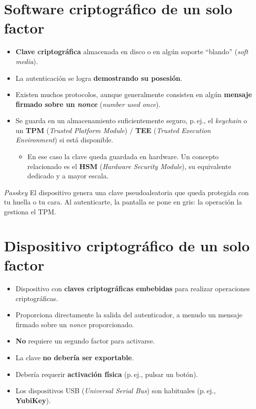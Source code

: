 \documentclass[11pt,a4paper]{report}
\begin{document}
\section{Software criptográfico de un solo factor}
 
\begin{itemize}
  \item \textbf{Clave criptográfica} almacenada en disco o en algún soporte ``blando'' (\emph{soft media}).
  \item La autenticación se logra \textbf{demostrando su posesión}.
  \item Existen muchos protocolos, aunque generalmente consisten en algún \textbf{mensaje firmado sobre un \emph{nonce}} (\emph{number used once}).
  \item Se guarda en un almacenamiento suficientemente seguro, p.\,ej., el \emph{keychain} o un \textbf{TPM} (\emph{Trusted Platform Module}) / \textbf{TEE} (\emph{Trusted Execution Environment}) si está disponible.
    \begin{itemize}
      \item En ese caso la clave queda guardada en hardware. Un concepto relacionado es el \textbf{HSM} (\emph{Hardware Security Module}), su equivalente dedicado y a mayor escala.
    \end{itemize}
\end{itemize}
 
\begin{ejemplo}{\emph{Passkey}}
El dispositivo genera una clave pseudoaleatoria que queda protegida con tu huella o tu cara. Al autenticarte, la pantalla se pone en gris: la operación la gestiona el TPM.
\end{ejemplo}
 
\section{Dispositivo criptográfico de un solo factor}
 
\begin{itemize}
  \item Dispositivo con \textbf{claves criptográficas embebidas} para realizar operaciones criptográficas.
  \item Proporciona directamente la salida del autenticador, a menudo un mensaje firmado sobre un \emph{nonce} proporcionado.
  \item \textbf{No} requiere un segundo factor para activarse.
  \item La clave \textbf{no debería ser exportable}.
  \item Debería requerir \textbf{activación física} (p.\,ej., pulsar un botón).
  \item Los dispositivos USB (\emph{Universal Serial Bus}) son habituales (p.\,ej., \textbf{YubiKey}).
\end{itemize}
 
\end{document}
